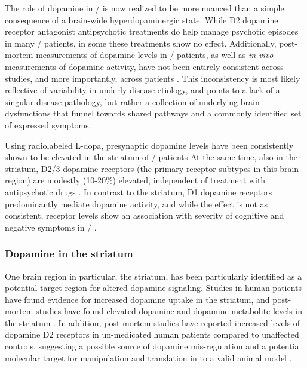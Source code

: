 The role of dopamine in \scz/ is now realized to be more nuanced than a simple consequence of a brain-wide hyperdopaminergic state.
While D2 dopamine receptor antagonist antipsychotic treatments do help manage psychotic episodes in many \scz/ patients, in some these treatments show no effect.
Additionally, post-mortem measurements of dopamine levels in \scz/ patients, as well as \emph{in vivo} measurements of dopamine activity, have not been entirely consistent across studies, and more importantly, across patients \citep{Davis1991}.
This inconsistency is most likely reflective of variability in underly disease etiology, and points to a lack of a singular disease pathology, but rather a collection of underlying brain dysfunctions that funnel towards shared pathways and a commonly identified set of expressed symptoms.

Using radiolabeled L-dopa, presynaptic dopamine levels have been consistently shown to be elevated in the striatum of \scz/ patients \citep[for review, see][]{Howes2007}
At the same time, also in the striatum, D2/3 dopamine receptors (the primary receptor subtypes in this brain region) are modestly (10-20\%) elevated, independent of treatment with antipsychotic drugs \citep[for review, see][]{Howes2009}.
In contrast to the striatum, D1 dopamine receptors predominantly mediate dopamine activity, and while the effect is not as consistent, receptor levels show an association with severity of cognitive and negative symptoms in \scz/ \citep{Goldman-Rakic2004}.



\subsubsection{Dopamine in the striatum}
One brain region in particular, the striatum, has been particularly identified as a potential target region for altered dopamine signaling. Studies in human patients have found evidence for increased dopamine uptake in the striatum, and post-mortem studies have found elevated dopamine and dopamine metabolite levels in the striatum \citep{Simpson2010}.
In addition, post-mortem studies have reported increased levels of dopamine D2 receptors in un-medicated human patients compared to unaffected controls, suggesting a possible source of dopamine mis-regulation and a potential molecular target for manipulation and translation in to a valid animal model \citep{XXXX}.

